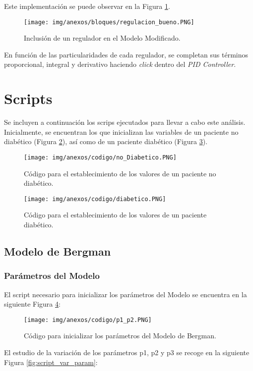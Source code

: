 Este implementación se puede observar en la Figura \ref{fig:diag_reg}.

\begin{figure}[htbp]
    \centering
    \texttt{[image: img/anexos/bloques/regulacion\_bueno.PNG]}
    \caption{Inclusión de un regulador en el Modelo Modificado.}
    \label{fig:diag_reg}
\end{figure}

En función de las particularidades de cada regulador, se completan sus términos proporcional, integral y derivativo haciendo \textit{click} dentro del \textit{PID Controller}.

\clearpage

\section{Scripts}

Se incluyen a continuación los scrips ejecutados para llevar a cabo este análisis. Inicialmente, se encuentran los que inicializan las variables de un paciente no diabético (Figura \ref{fig:script_no_diab}), así como de un paciente diabético (Figura \ref{fig:script_diab}).

\begin{figure}[htbp]
    \centering
    \texttt{[image: img/anexos/codigo/no\_Diabetico.PNG]}
    \caption{Código para el establecimiento de los valores de un paciente no diabético.}
    \label{fig:script_no_diab}
\end{figure}
\begin{figure}[htbp]
    \centering
    \texttt{[image: img/anexos/codigo/diabetico.PNG]}
    \caption{Código para el establecimiento de los valores de un paciente diabético.}
    \label{fig:script_diab}
\end{figure}


\subsection{Modelo de Bergman}

\subsubsection{Parámetros del Modelo}

El script necesario para inicializar los parámetros del Modelo se encuentra en la siguiente Figura \ref{fig:script_parametros}:

\begin{figure}[htbp]
    \centering
    \texttt{[image: img/anexos/codigo/p1\_p2.PNG]}
    \caption{Código para inicializar los parámetros del Modelo de Bergman.}
    \label{fig:script_parametros}
\end{figure}
\clearpage
El estudio de la variación de los parámetros p1, p2 y p3 se recoge en la siguiente Figura \ref{fig:script_var_param}:


